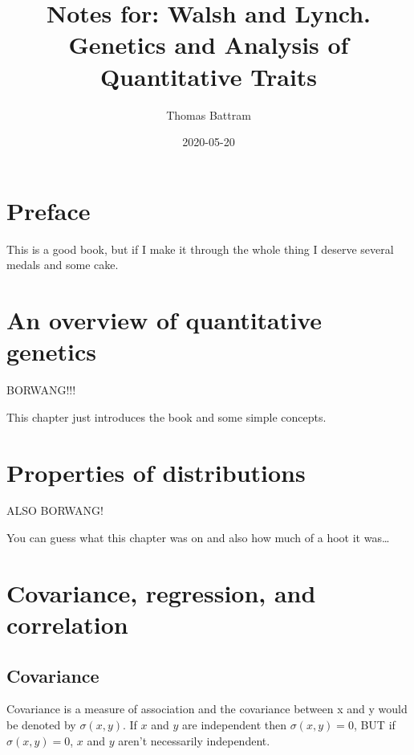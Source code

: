 \documentclass[
]{book}
\title{Notes for: Walsh and Lynch. Genetics and Analysis of Quantitative Traits}
\author{Thomas Battram}
\date{2020-05-20}
\begin{document}
\maketitle

{
\setcounter{tocdepth}{1}
\tableofcontents
}
\hypertarget{preface}{%
\chapter*{Preface}\label{preface}}

This is a good book, but if I make it through the whole thing I deserve several medals and some cake.

\hypertarget{an-overview-of-quantitative-genetics}{%
\chapter{An overview of quantitative genetics}\label{an-overview-of-quantitative-genetics}}

BORWANG!!!

This chapter just introduces the book and some simple concepts.

\hypertarget{properties-of-distributions}{%
\chapter{Properties of distributions}\label{properties-of-distributions}}

ALSO BORWANG!

You can guess what this chapter was on and also how much of a hoot it was\ldots{}

\hypertarget{covariance-regression-and-correlation}{%
\chapter{Covariance, regression, and correlation}\label{covariance-regression-and-correlation}}

\hypertarget{covariance}{%
\section{Covariance}\label{covariance}}

Covariance is a measure of association and the covariance between x and y would be denoted by \(\sigma(x, y)\). If \(x\) and \(y\) are independent then \(\sigma(x, y) = 0\), BUT if \(\sigma(x, y) = 0\), \(x\) and \(y\) aren't necessarily independent.
\end{document}
